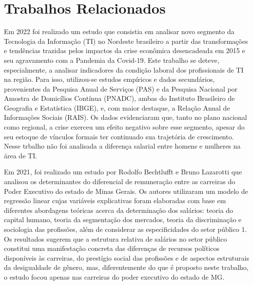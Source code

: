 \section{Trabalhos Relacionados}

Em 2022 foi realizado um estudo \cite{oliveira2022profissionais} que consistia em analisar novo segmento da Tecnologia da Informação (TI) no Nordeste brasileiro a partir das transformações e tendências trazidas pelos impactos da crise econômica desencadeada em 2015 e seu agravamento com a Pandemia da Covid-19. Este trabalho se deteve, especialmente, a analisar indicadores da condição laboral dos profissionais de TI na região. Para isso, utilizou-se estudos empíricos e dados secundários, provenientes da Pesquisa Anual de Serviços (PAS) e da Pesquisa Nacional por Amostra de Domicílios Contínua (PNADC), ambas do Instituto Brasileiro de Geografia e Estatística (IBGE), e, com maior destaque, a Relação Anual de Informações Sociais (RAIS). Os dados evidenciaram que, tanto no plano nacional como regional, a crise exerceu um efeito negativo sobre esse segmento, apesar do seu estoque de vínculos formais ter continuado sua trajetória de crescimento. Nesse trbalho não foi analisada a diferença salarial entre homens e mulheres na área de TI.

Em 2021, foi realizado um estudo por Rodolfo Bechtlufft e Bruno Lazarotti \cite{bechtlufft2021determinantes} que analisou os determinantes do diferencial de remuneração entre as carreiras do Poder Executivo do estado de Minas Gerais. Os autores utilizaram um modelo de regressão linear cujas variáveis explicativas foram elaboradas com base em diferentes abordagens teóricas acerca da determinação dos salários: teoria do capital humano, teoria da segmentação dos mercados, teoria da discriminação e sociologia das profissões, além de considerar as especificidades do setor público 1. Os resultados sugerem que a estrutura relativa de salários no setor público constitui uma manifestação concreta das diferenças de recursos políticos disponíveis às carreiras, do prestígio social das profissões e de aspectos estruturais da desigualdade de gênero, mas, diferentemente do que é proposto neste trabalho, o estudo focou apenas nas carreiras do poder executivo do estado de MG.